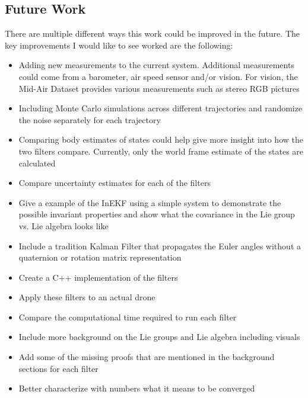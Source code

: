 \subsection{Future Work}
There are multiple different ways this work could be improved in the future. The key improvements I would like to see worked are the following:
\begin{itemize}
    \item Adding new measurements to the current system. Additional measurements could come from a barometer, air speed sensor and/or vision. For vision, the Mid-Air Dataset \cite{Fonder2019MidAir} provides various measurements such as stereo RGB pictures
    \item Including Monte Carlo simulations across different trajectories and randomize the noise separately for each trajectory
    \item Comparing body estimates of states could help give more insight into how the two filters compare. Currently, only the world frame estimate of the states are calculated
    \item Compare uncertainty estimates for each of the filters
    \item Give a example of the InEKF using a simple system to demonstrate the possible invariant properties and show what the covariance in the Lie group vs. Lie algebra looks like
    \item Include a tradition Kalman Filter that propagates the Euler angles without a quaternion or rotation matrix representation
    \item Create a C++ implementation of the filters
     \item Apply these filters to an actual drone
    \item Compare the computational time required to run each filter
    \item Include more background on the Lie groups and Lie algebra including visuals
    \item Add some of the missing proofs that are mentioned in the background sections for each filter
    \item Better characterize with numbers what it means to be converged
\end{itemize}

\clearpage
